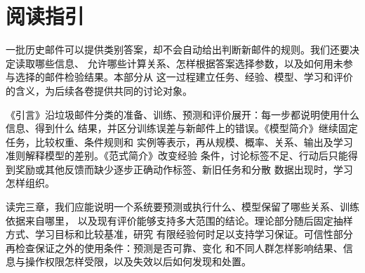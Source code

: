 \chapter*{阅读指引}

一批历史邮件可以提供类别答案，却不会自动给出判断新邮件的规则。我们还要决定读取哪些信息、
允许哪些计算关系、怎样根据答案选择参数，以及如何用未参与选择的邮件检验结果。本部分从
这一过程建立任务、经验、模型、学习和评价的含义，为后续各卷提供共同的讨论对象。

《引言》沿垃圾邮件分类的准备、训练、预测和评价展开：每一步都说明使用什么信息、得到什么
结果，并区分训练误差与新邮件上的错误。《模型简介》继续固定任务，比较权重、条件规则和
实例等表示，再从规模、概率、关系、输出及学习准则解释模型的差别。《范式简介》改变经验
条件，讨论标签不足、行动后只能得到奖励或其他反馈而缺少逐步正确动作标签、新旧任务和分散
数据出现时，学习怎样组织。

读完三章，我们应能说明一个系统要预测或执行什么、模型保留了哪些关系、训练依据来自哪里，
以及现有评价能够支持多大范围的结论。理论部分随后固定抽样方式、学习目标和比较基准，研究
有限经验何时足以支持学习保证。可信性部分再检查保证之外的使用条件：预测是否可靠、变化
和不同人群怎样影响结果、信息与操作权限怎样受限，以及失效以后如何发现和处置。
